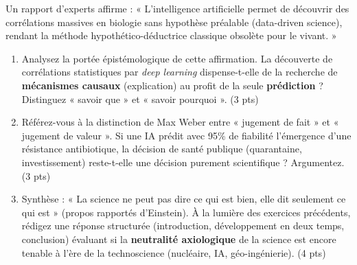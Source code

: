 \documentclass[11pt]{article}
\begin{document}
\begin{exercice}
Un rapport d'experts affirme : « L'intelligence artificielle permet de découvrir des corrélations massives en biologie sans hypothèse préalable (data-driven science), rendant la méthode hypothético-déductrice classique obsolète pour le vivant. »
\begin{enumerate}
    \item Analysez la portée épistémologique de cette affirmation. La découverte de corrélations statistiques par \textit{deep learning} dispense-t-elle de la recherche de \textbf{mécanismes causaux} (explication) au profit de la seule \textbf{prédiction} ? Distinguez « savoir que » et « savoir pourquoi ». \hfill (3 pts)
    \item Référez-vous à la distinction de Max Weber entre « jugement de fait » et « jugement de valeur ». Si une IA prédit avec 95\% de fiabilité l'émergence d'une résistance antibiotique, la décision de santé publique (quarantaine, investissement) reste-t-elle une décision purement scientifique ? Argumentez. \hfill (3 pts)
    \item Synthèse : « La science ne peut pas dire ce qui est bien, elle dit seulement ce qui est » (propos rapportés d'Einstein). À la lumière des exercices précédents, rédigez une réponse structurée (introduction, développement en deux temps, conclusion) évaluant si la \textbf{neutralité axiologique} de la science est encore tenable à l'ère de la technoscience (nucléaire, IA, géo-ingénierie). \hfill (4 pts)
\end{enumerate}
\end{exercice}
\end{document}
